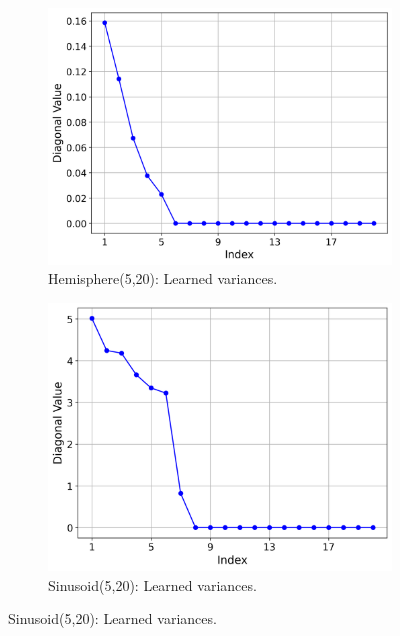 \begin{figure}[h!]
    \centering

    \begin{subfigure}[b]{0.48\textwidth}
        \centering
        \includegraphics[width=\textwidth]{chapter5/results/visualisations/RAE/reconstruction/hemisphere_5_20/diagonal_values_normal_scale.png}
        \caption{Hemisphere(5,20): Learned variances.}
        \label{fig:hemisphere_variances}
    \end{subfigure}
    \hfill
    \begin{subfigure}[b]{0.48\textwidth}
        \centering
        \includegraphics[width=\textwidth]{chapter5/results/visualisations/RAE/reconstruction/sinusoid_5_20/diagonal_values_normal_scale.png}
        \caption{Sinusoid(5,20): Learned variances.}
        \label{fig:sinusoid_variances}
    \end{subfigure}


\end{figure}
